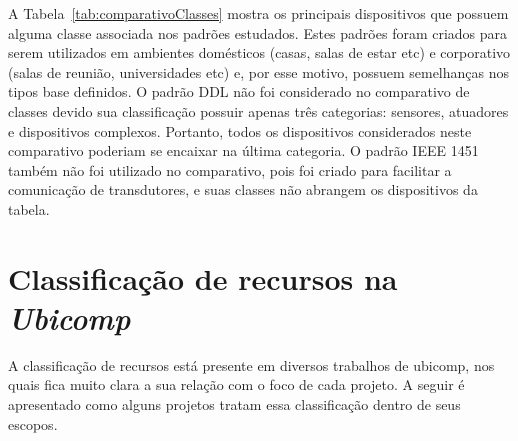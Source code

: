 A Tabela~\ref{tab:comparativoClasses} mostra os principais dispositivos que possuem alguma classe associada nos padrões estudados. Estes padrões foram criados para serem utilizados em ambientes domésticos (casas, salas de estar etc) e corporativo (salas de reunião, universidades etc) e, por esse motivo, possuem semelhanças nos tipos base definidos. O padrão DDL não foi considerado no comparativo de classes devido sua classificação possuir apenas três categorias: sensores, atuadores e dispositivos complexos. Portanto, todos os dispositivos considerados neste comparativo poderiam se encaixar na última categoria. O padrão IEEE 1451 também não foi utilizado no comparativo, pois foi criado para facilitar a comunicação de transdutores, e suas classes não abrangem os dispositivos da tabela. 
\section{Classificação de recursos na \emph{Ubicomp}}
\label{sec:correlatos}

A classificação de recursos está presente em diversos trabalhos de ubicomp, nos quais fica muito clara a sua relação com o foco de cada projeto. A seguir é apresentado como alguns projetos tratam essa classificação dentro de seus escopos.




